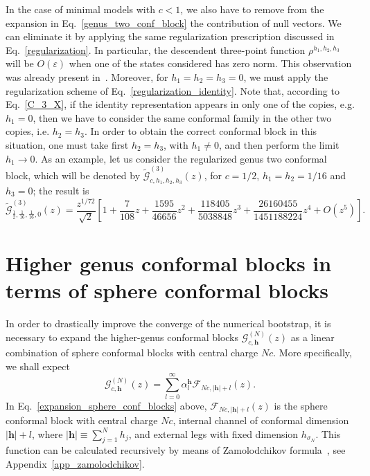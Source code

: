 \documentclass[a4paper,11pt]{article}
\begin{document}
In the case of minimal models with $c<1$, we also have to remove from the expansion in
Eq.~\eqref{genus_two_conf_block} the contribution of null vectors. We can eliminate it by
applying the same regularization prescription discussed in Eq.~\eqref{regularization}. In particular, the descendent three-point function $\rho^{h_1,h_2,h_3}$ will be $O(\varepsilon)$ when one of the states considered  has zero norm. This observation was already present in~\cite{Zamolodchikov2}.
Moreover, for $h_1=h_2=h_3=0$, we must apply the regularization 
scheme of Eq.~\eqref{regularization_identity}. Note that, according to Eq.~\eqref{C_3_X},
if the identity representation appears in only one of the copies, e.g. $h_1=0$, then 
we have to consider the same conformal family in the other two copies, i.e. $h_2=h_3$. In order 
to obtain the correct conformal block in this situation, one must take first $h_2=h_3$, with $h_1\neq0$,
and then perform the limit $h_1\to 0$.  As an example, let us consider the regularized 
genus two conformal block, which will be denoted by $\tilde{\mathcal{G}}_{c, h_1, h_2, h_3}^{(3)}(z)$,
for $c=1/2$, $h_1=h_2=1/16$ and $h_3=0$; the result is
\begin{equation}
 \tilde{\mathcal{G}}_{\frac{1}{2}, \frac{1}{16}, \frac{1}{16}, 0}^{(3)}(z)=
 \frac{z^{1/72}}{\sqrt{2}}\left[1 + \frac{7}{108}z + \frac{1595}{46656}z^2 + \frac{118405}{5038848}z^3 + 
 \frac{26160455}{1451188224}z^4 + O(z^5)\right].
\end{equation}
\section{Higher genus conformal blocks in terms of sphere conformal blocks}\label{app_sphere_conf_blocks}

In order to drastically improve the converge of the numerical bootstrap, it is necessary to expand the higher-genus conformal blocks $\mathcal{G}_{c,\boldsymbol{h}}^{(N)}(z)$ as a linear combination of sphere conformal blocks with central charge $Nc$. More specifically, we shall expect
\begin{equation}\label{expansion_sphere_conf_blocks}
 \mathcal{G}_{c, \boldsymbol{h}}^{(N)}(z)=\sum_{l=0}^{\infty}\alpha_{l}^{\boldsymbol{h}}
 \mathcal{F}_{Nc, |\boldsymbol{h}|+l}(z).
\end{equation}
In Eq.~\eqref{expansion_sphere_conf_blocks} above,  $\mathcal{F}_{Nc, |\boldsymbol{h}|+l}(z)$ is the sphere conformal block 
with central charge $Nc$, internal channel of conformal dimension $|\boldsymbol{h}|+l$, where $|\boldsymbol{h}|\equiv \sum_{j=1}^N h_j$, and external legs with fixed dimension 
$h_{\sigma_N}$. This function can be calculated
recursively by means of Zamolodchikov formula~\cite{Zamolodchikov2, Zamolodchikov}, see Appendix~\ref{app_zamolodchikov}.
\end{document}
